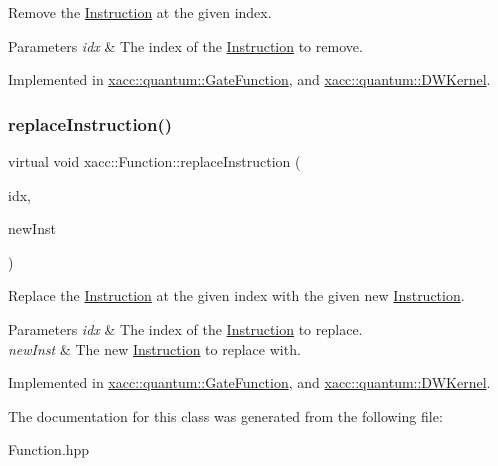 Remove the \hyperlink{a01657}{Instruction} at the given index.


\begin{DoxyParams}{Parameters}
{\em idx} & The index of the \hyperlink{a01657}{Instruction} to remove. \\
\hline
\end{DoxyParams}


Implemented in \hyperlink{a01249_a44ca35d081577de9ad2930f93c01e89d}{xacc\+::quantum\+::\+Gate\+Function}, and \hyperlink{a01221_af2bcfd679e6cb89194f3f0bff8622b99}{xacc\+::quantum\+::\+D\+W\+Kernel}.

\mbox{\label{a01653_a2ef6a4923a6734f90f6ee3d94d263af0}} 
\subsubsection{\texorpdfstring{replace\+Instruction()}{replaceInstruction()}}
{\footnotesize\ttfamily virtual void xacc\+::\+Function\+::replace\+Instruction (\begin{DoxyParamCaption}\item[{const int}]{idx,  }\item[{Inst\+Ptr}]{new\+Inst }\end{DoxyParamCaption})\hspace{0.3cm}{\ttfamily [pure virtual]}}

Replace the \hyperlink{a01657}{Instruction} at the given index with the given new \hyperlink{a01657}{Instruction}.


\begin{DoxyParams}{Parameters}
{\em idx} & The index of the \hyperlink{a01657}{Instruction} to replace. \\
\hline
{\em new\+Inst} & The new \hyperlink{a01657}{Instruction} to replace with. \\
\hline
\end{DoxyParams}


Implemented in \hyperlink{a01249_a182fdfabbf546ae89e4f2384bafb45c9}{xacc\+::quantum\+::\+Gate\+Function}, and \hyperlink{a01221_a75eb3560d2f81c9a5ae1cf765deb0e83}{xacc\+::quantum\+::\+D\+W\+Kernel}.



The documentation for this class was generated from the following file\+:\begin{DoxyCompactItemize}
\item 
Function.\+hpp\end{DoxyCompactItemize}
